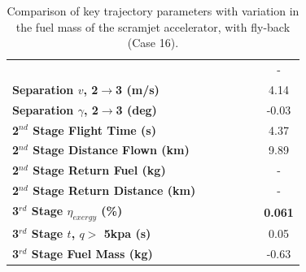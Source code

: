 \begin{table}[ht]
\begin{tabular}{l c c c c c c}
	& \secondthirdSeparationAltmFuelNinety
	& \secondthirdSeparationAltmFuelNinetyFive
	& \secondthirdSeparationAltmFuelStandard
	& \secondthirdSeparationAltmFuelOneHundredFive
	& \secondthirdSeparationAltmFuelOneHundredTen
	& -
	\\
	\textbf{Separation $v$, 2$\rightarrow$3 (m/s)}
	& \secondthirdSeparationvmFuelNinety
	& \secondthirdSeparationvmFuelNinetyFive
	& \secondthirdSeparationvmFuelStandard
	& \secondthirdSeparationvmFuelOneHundredFive
	& \secondthirdSeparationvmFuelOneHundredTen
	&4.14
	\\
	\textbf{Separation $\gamma$, 2$\rightarrow$3 (deg)}
	& \secondthirdSeparationgammamFuelNinety
	& \secondthirdSeparationgammamFuelNinetyFive
	& \secondthirdSeparationgammamFuelStandard
	& \secondthirdSeparationgammamFuelOneHundredFive
	& \secondthirdSeparationgammamFuelOneHundredTen
	&-0.03
	\\
	\textbf{2$^{nd}$ Stage Flight Time (s)}
	& \secondFlightTimemFuelNinety
	& \secondFlightTimemFuelNinetyFive
	& \secondFlightTimemFuelStandard
	& \secondFlightTimemFuelOneHundredFive
	& \secondFlightTimemFuelOneHundredTen
	&4.37
	\\
	\textbf{2$^{nd}$ Stage Distance Flown (km)}
	& \SecondDistmFuelNinety
	& \SecondDistmFuelNinetyFive
	& \SecondDistmFuelStandard
	& \SecondDistmFuelOneHundredFive
	& \SecondDistmFuelOneHundredTen
	&9.89
	\\
	\textbf{2$^{nd}$ Stage Return Fuel (kg)}
	& \returnFuelmFuelNinety
	& \returnFuelmFuelNinetyFive
	& \returnFuelmFuelStandard
	& \returnFuelmFuelOneHundredFive
	& \returnFuelmFuelOneHundredTen
	& -
	\\
	\textbf{2$^{nd}$ Stage Return Distance (km)}
	& \returnDistmFuelNinety
	& \returnDistmFuelNinetyFive
	& \returnDistmFuelStandard
	& \returnDistmFuelOneHundredFive
	& \returnDistmFuelOneHundredTen
	& -
	\\
	\hline 
	\textbf{3$^{rd}$ Stage $\eta_{exergy}$ (\%)}
	& \textbf{\thirddExergyEffmFuelNinety}
	& \textbf{\thirddExergyEffmFuelNinetyFive}
	& \textbf{\thirddExergyEffmFuelStandard}
	& \textbf{\thirddExergyEffmFuelOneHundredFive}
	& \textbf{\thirddExergyEffmFuelOneHundredTen}
	& \textbf{0.061}
	\\
	\textbf{3$^{rd}$ Stage $t$, $q >$ 5kpa (s)}
	& \thirdqOverFivemFuelNinety
	& \thirdqOverFivemFuelNinetyFive
	& \thirdqOverFivemFuelStandard
	& \thirdqOverFivemFuelOneHundredFive
	& \thirdqOverFivemFuelOneHundredTen
	&0.05
	\\
	\textbf{3$^{rd}$ Stage Fuel Mass (kg)}
	& \thirdmFuelmFuelNinety
	& \thirdmFuelmFuelNinetyFive
	& \thirdmFuelmFuelStandard
	& \thirdmFuelmFuelOneHundredFive
	& \thirdmFuelmFuelOneHundredTen
	&-0.63
	\\
	\hline 
\end{tabular} 
\caption{Comparison of key trajectory parameters with variation in the fuel mass of the scramjet accelerator, with fly-back (Case 16).}
\label{tab:comparison111}
\end{table}
	
